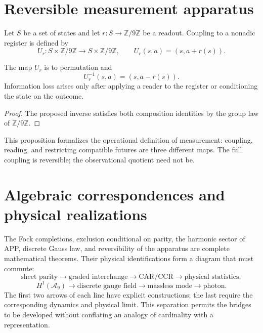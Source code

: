 \section{Reversible measurement apparatus}

Let \(S\) be a set of states and let \(r:S\to\mathbb Z/9\mathbb Z\) be a
readout. Coupling to a nonadic register is defined by
\[
 U_r:S\times\mathbb Z/9\mathbb Z\longrightarrow
 S\times\mathbb Z/9\mathbb Z,
 \qquad
 U_r(s,a)=(s,a+r(s)).
\]

\begin{proposition}
The map \(U_r\) is to permutation and
\[
 U_r^{-1}(s,a)=(s,a-r(s)).
\]
Information loss arises only after applying a reader to the
register or conditioning the state on the outcome.
\end{proposition}

\begin{proof}
The proposed inverse satisfies both composition identities by the
group law of \(\mathbb Z/9\mathbb Z\).
\end{proof}

This proposition formalizes the operational definition of measurement: coupling,
reading, and restricting compatible futures are three different maps. The
full coupling is reversible; the observational quotient need not be.

\section{Algebraic correspondences and physical realizations}

The Fock completions, exclusion conditional on parity, the harmonic
sector of APP, discrete Gauss law, and reversibility of the apparatus are complete
mathematical theorems. Their physical identifications form a diagram that
must commute:
\[
 \text{sheet parity}
 \longrightarrow\text{graded interchange}
 \longrightarrow\text{CAR/CCR}
 \longrightarrow\text{physical statistics},
\]
\[
 H^1(\mathcal A_9)
 \longrightarrow\text{discrete gauge field}
 \longrightarrow\text{massless mode}
 \longrightarrow\text{photon}.
\]
The first two arrows of each line have explicit constructions; the
last require the corresponding dynamics and physical limit. This
separation permits the bridges to be developed without conflating an analogy of
cardinality with a representation.
